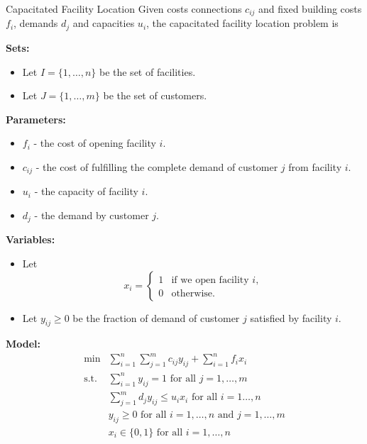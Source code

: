 \begin{general}{Capacitated Facility Location}{\npcomplete}
Given costs connections $c_{ij}$ and fixed building costs $f_i$, demands $d_j$ and capacities $u_i$, the capacitated facility location problem is 

\noindent \textbf{Sets:}
\begin{itemize}
\item Let $I = \{1,\dots, n\}$ be the set of facilities.
\item Let $J = \{1, \dots, m\}$ be the set of customers.
\end{itemize}

\noindent \textbf{Parameters:}
\begin{itemize}
\item $f_i$ - the cost of opening facility $i$.
\item $c_{ij}$ - the cost of fulfilling the complete demand of customer $j$ from facility $i$.
\item $u_{i}$ - the capacity of facility $i$.
\item $d_{j}$ - the demand by customer $j$.
\end{itemize}

\noindent \textbf{Variables:}
\begin{itemize}
\item Let 
\begin{equation*}
x_{i} = \begin{cases}
1 & \text{if we open facility $i$,}\\
0 & \text{otherwise.}
\end{cases}
\end{equation*}
\item Let $y_{ij} \geq 0$ be the fraction of demand of customer $j$ satisfied by facility $i$.
\end{itemize}

\noindent  \textbf{Model:}
\begin{align}
\min & \displaystyle\sum_{i=1}^n\sum_{j=1}^mc_{ij}y_{ij}+\sum_{i=1}^nf_ix_i \tag{total cost}\\
\text{s.t.} & \displaystyle\sum_{i=1}^ny_{ij}=1 \text{ for all }j=1,\dots,m \tag{assign demand to facility}\\
& \displaystyle \sum_{j=1}^md_jy_{ij}\leqslant u_ix_i\text{ for all }i=1\dots,n \tag{capacity of facility $i$}\\
&y_{ij}\geqslant0\text{ for all }i=1,\dots,n \text{ and }j=1,\dots,m \tag{nonnegative fraction of demand satisfied}\\
&x_i\in\{0,1\}\text{ for all } i=1,\dots,n \tag{open/not open facility}
\end{align}

\end{general}


